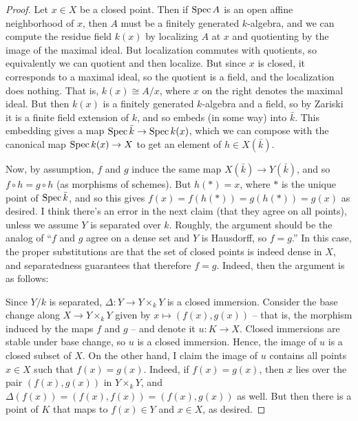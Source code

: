 \begin{proof}
	Let $x \in X$ be a closed point. Then if $\operatorname{Spec} A$ is an open affine neighborhood of $x$, then $A$ must be a finitely generated $k$-algebra, and we can compute the residue field $k(x)$ by localizing $A$ at $x$ and quotienting by the image of the maximal ideal. But localization commutes with quotients, so equivalently we can quotient and then localize. But since $x$ is closed, it corresponds to a maximal ideal, so the quotient is a field, and the localization does nothing. That is, $k(x) \cong A/x$, where $x$ on the right denotes the maximal ideal. But then $k(x)$ is a finitely generated $k$-algebra and a field, so by Zariski it is a finite field extension of $k$, and so embeds (in some way) into $\bar{k}$. This embedding gives a map $\operatorname{Spec}\bar{k} \to \operatorname{Spec} k(x)$, which we can compose with the canonical map $\operatorname{Spec} k(x) \to X$ to get an element of $h \in X(\bar{k})$.
	
	Now, by assumption, $f$ and $g$ induce the same map $X(\bar{k}) \to Y(\bar{k})$, and so $f \circ h = g \circ h$ (as morphisms of schemes). But $h(\ast) = x$, where $\ast$ is the unique point of $\operatorname{Spec}\bar{k}$, and so this gives $f(x) = f(h(\ast)) = g(h(\ast)) = g(x)$ as desired. I think there's an error in the next claim (that they agree on all points), unless we assume $Y$ is separated over $k$. Roughly, the argument should be the analog of ``$f$ and $g$ agree on a dense set and $Y$ is Hausdorff, so $f=g$.'' In this case, the proper substitutions are that the set of closed points is indeed dense in $X$, and separatedness guarantees that therefore $f=g$. Indeed, then the argument is as follows:
	
	Since $Y/k$ is separated, $\Delta : Y \to Y \times_k Y$ is a closed immersion. Consider the base change along $X \to Y \times_k Y$ given by $x \mapsto (f(x),g(x))$ -- that is, the morphism induced by the maps $f$ and $g$ -- and denote it $u : K \to X$. Closed immersions are stable under base change, so $u$ is a closed immersion. Hence, the image of $u$ is a closed subset of $X$. On the other hand, I claim the image of $u$ contains all points $x \in X$ such that $f(x) = g(x)$. Indeed, if $f(x) = g(x)$, then $x$ lies over the pair $(f(x),g(x))$ in $Y \times_k Y$, and $\Delta(f(x)) = (f(x),f(x)) = (f(x),g(x))$ as well. But then there is a point of $K$ that maps to $f(x) \in Y$ and $x \in X$, as desired.
	

\end{proof}
